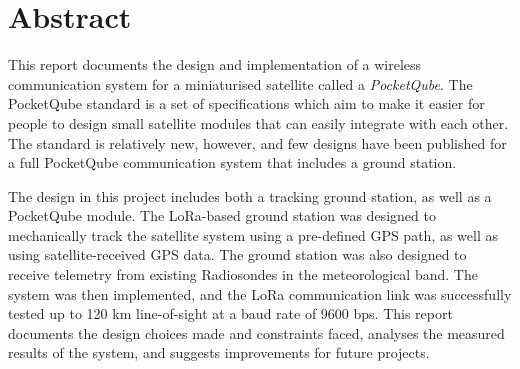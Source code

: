 \chapter*{Abstract}
\makeatletter{}\makeatother

This report documents the design and implementation of a wireless communication system for a miniaturised satellite called a \textit{PocketQube}. The PocketQube standard is a set of specifications which aim to make it easier for people to design small satellite modules that can easily integrate with each other. The standard is relatively new, however, and few designs have been published for a full PocketQube communication system that includes a ground station.

The design in this project includes both a tracking ground station, as well as a PocketQube module. The LoRa-based ground station was designed to mechanically track the satellite system using a pre-defined GPS path, as well as using satellite-received GPS data. The ground station was also designed to receive telemetry from existing Radiosondes in the meteorological band. The system was then implemented, and the LoRa communication link was successfully tested up to 120 km line-of-sight at a baud rate of 9600 bps. This report documents the design choices made and constraints faced, analyses the measured results of the system, and suggests improvements for future projects.

